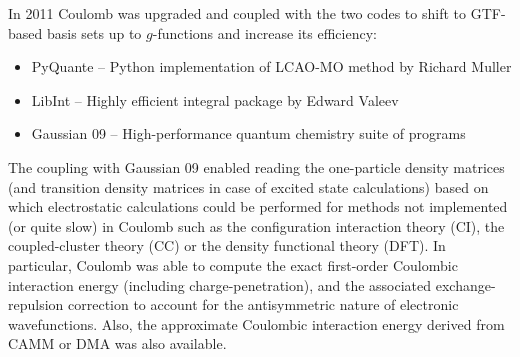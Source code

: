 \documentclass[b5paper,oneside,fleqn,11pt]{book}
\begin{document}
\begin{refsection}
In 2011 {\sc Coulomb} was upgraded and coupled with the two codes to shift to GTF\hyp{}based
basis sets up to $g$-functions and increase its efficiency:
%
\begin{itemize}
\item {\sc PyQuante} -- Python implementation of LCAO-MO method by Richard Muller \citep{Muller.PyQuante.2009}
\item {\sc LibInt} -- Highly efficient integral package by Edward Valeev \citep{Valeev.LibInt.2013}
\item {\sc Gaussian 09} -- High\hyp{}performance quantum chemistry suite of programs \citep{Frisch.Gaussian.2009}
\end{itemize}
%
The coupling with {\sc Gaussian 09} \citep{Frisch.Gaussian.2009} 
enabled reading the one\hyp{}particle 
density matrices (and transition density matrices in case of excited state
calculations) based on which electrostatic calculations could be performed
for methods not implemented (or quite slow) in {\sc Coulomb} such as the 
configuration interaction theory (CI), the
coupled\hyp{}cluster theory (CC) or the density functional theory (DFT).
In particular, {\sc Coulomb} was able to compute the exact first\hyp{}order
Coulombic interaction energy (including charge\hyp{}penetration),
and the associated exchange\hyp{}repulsion correction to account
for the antisymmetric nature of electronic wavefunctions.
Also, the
approximate Coulombic interaction energy derived from CAMM or DMA
was also available.


\end{refsection}
\end{document}
